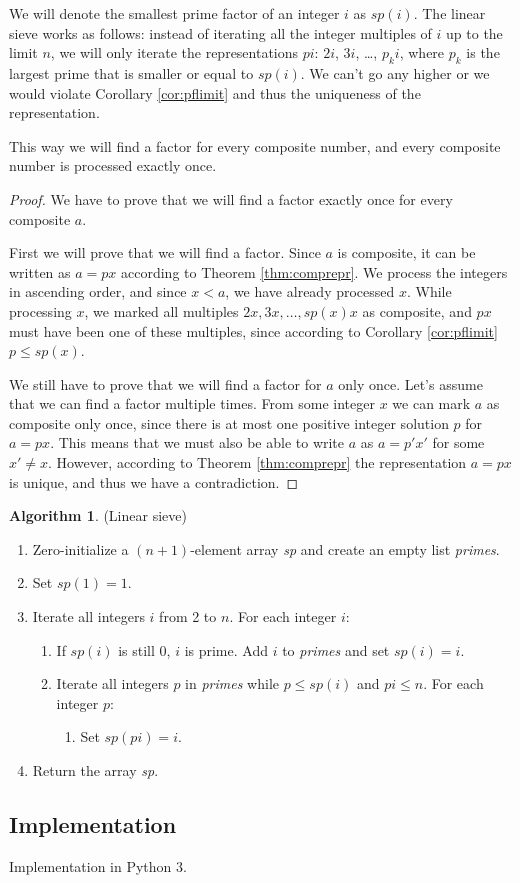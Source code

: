 \documentclass[12pt] {article}
\theoremstyle{plain}
\theoremstyle{definition}
\newtheorem{algo}[thm]{Algorithm}
\begin{document}
We will denote the smallest prime factor of an integer $i$ as $sp(i)$. The linear sieve works as follows: instead of iterating all the integer multiples of $i$ up to the limit $n$, we will only iterate the representations $pi$: $2i$, $3i$, \dots , $p_ki$, where $p_k$ is the largest prime that is smaller or equal to $sp(i)$. We can't go any higher or we would violate Corollary \ref{cor:pflimit} and thus the uniqueness of the representation. 

This way we will find a factor for every composite number, and every composite number is processed exactly once.

\begin{proof}
We have to prove that we will find a factor exactly once for every composite $a$.

First we will prove that we will find a factor. Since $a$ is composite, it can be written as $a = px$ according to Theorem \ref{thm:comprepr}. We process the integers in ascending order, and since $x < a$, we have already processed $x$. While processing $x$, we marked all multiples $2x, 3x, \dots, sp(x)x$ as composite, and $px$ must have been one of these multiples, since according to Corollary \ref{cor:pflimit} $p \leq sp(x)$.

We still have to prove that we will find a factor for $a$ only once. Let's assume that we can find a factor multiple times. From some integer $x$ we can mark $a$ as composite only once, since there is at most one positive integer solution $p$ for $a = px$. This means that we must also be able to write $a$ as $a = p'x'$ for some $x' \neq x$. However, according to Theorem \ref{thm:comprepr} the representation $a = px$ is unique, and thus we have a contradiction.
\end{proof}

\begin{algo} (Linear sieve)
\begin{enumerate}
\item Zero-initialize a $(n+1)$-element array \textit{sp} and create an empty list \textit{primes}.
\item Set $sp(1) = 1$.
\item Iterate all integers $i$ from 2 to $n$. For each integer $i$:
\begin{enumerate}
	\item If $sp(i)$ is still 0, $i$ is prime. Add $i$ to \textit{primes} and set $sp(i) = i$.
	\item Iterate all integers $p$ in \textit{primes} while $p \leq sp(i)$ and $pi \leq n$. For each integer $p$:
\begin{enumerate}
		\item Set $sp(pi) = i$.
\end{enumerate}
\end{enumerate}
\item Return the array \textit{sp}.
\end{enumerate}
\end{algo}

\subsection {Implementation}

Implementation in Python 3.



\printbibliography
\end{document}

